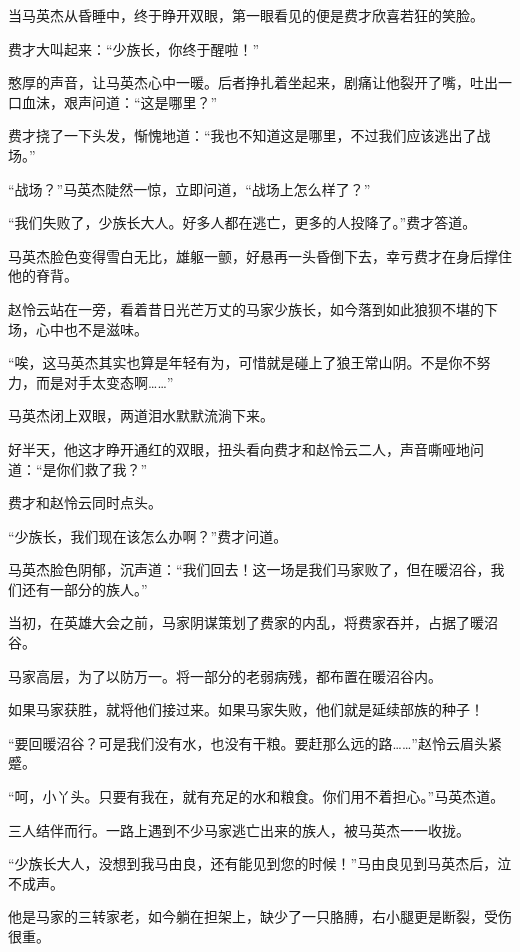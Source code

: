 
\begin{this_body}

当马英杰从昏睡中，终于睁开双眼，第一眼看见的便是费才欣喜若狂的笑脸。

费才大叫起来：“少族长，你终于醒啦！”

憨厚的声音，让马英杰心中一暖。后者挣扎着坐起来，剧痛让他裂开了嘴，吐出一口血沫，艰声问道：“这是哪里？”

费才挠了一下头发，惭愧地道：“我也不知道这是哪里，不过我们应该逃出了战场。”

“战场？”马英杰陡然一惊，立即问道，“战场上怎么样了？”

“我们失败了，少族长大人。好多人都在逃亡，更多的人投降了。”费才答道。

马英杰脸色变得雪白无比，雄躯一颤，好悬再一头昏倒下去，幸亏费才在身后撑住他的脊背。

赵怜云站在一旁，看着昔日光芒万丈的马家少族长，如今落到如此狼狈不堪的下场，心中也不是滋味。

“唉，这马英杰其实也算是年轻有为，可惜就是碰上了狼王常山阴。不是你不努力，而是对手太变态啊……”

马英杰闭上双眼，两道泪水默默流淌下来。

好半天，他这才睁开通红的双眼，扭头看向费才和赵怜云二人，声音嘶哑地问道：“是你们救了我？”

费才和赵怜云同时点头。

“少族长，我们现在该怎么办啊？”费才问道。

马英杰脸色阴郁，沉声道：“我们回去！这一场是我们马家败了，但在暖沼谷，我们还有一部分的族人。”

当初，在英雄大会之前，马家阴谋策划了费家的内乱，将费家吞并，占据了暖沼谷。

马家高层，为了以防万一。将一部分的老弱病残，都布置在暖沼谷内。

如果马家获胜，就将他们接过来。如果马家失败，他们就是延续部族的种子！

“要回暖沼谷？可是我们没有水，也没有干粮。要赶那么远的路……”赵怜云眉头紧蹙。

“呵，小丫头。只要有我在，就有充足的水和粮食。你们用不着担心。”马英杰道。

三人结伴而行。一路上遇到不少马家逃亡出来的族人，被马英杰一一收拢。

“少族长大人，没想到我马由良，还有能见到您的时候！”马由良见到马英杰后，泣不成声。

他是马家的三转家老，如今躺在担架上，缺少了一只胳膊，右小腿更是断裂，受伤很重。


\end{this_body}
